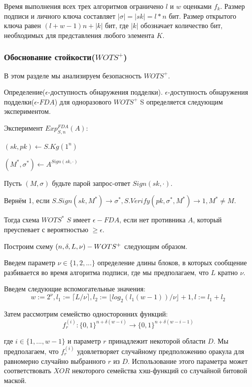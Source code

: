 \documentclass[a4paper, 14pt]{extarticle}
\begin{document}
Время выполнения всех трех алгоритмов ограничено $l$ и $w$ оценками $f_{k}$. Размер подписи и личного ключа составляет $|\sigma| = |sk| = l*n$ бит. Размер открытого ключа равен $(l + w - 1)n + |k|$ бит, где $|k|$ обозначает количество бит, необходимых для представления любого элемента $K$.
\subsubsection{Обоснование стойкости($WOTS^{+}$)}
В этом разделе мы анализируем безопасность $WOTS^{+}$.

Определение($\epsilon$-доступность обнаружения подделки). $\epsilon$-доступность обнаружения подделки($\epsilon$-$FDA$) для одноразового $WOTS^{+}$ S определяется следующим экспериментом.

Эксперимент $Exp^{F D A}_{S,n}(A)$:

\hspace{10mm} $(sk, pk) \leftarrow S.Kg(1^n)$

\hspace{10mm} $(M^{*}, \sigma^{*}) \leftarrow A^{Sign(sk,\cdot)}$

Пусть $(M, \sigma)$ будьте парой запрос-ответ $Sign(sk,\cdot)$.

Вернём 1, если $S.Sign(sk, M^{*}) \rightarrow \sigma^{*}, S.Verify(pk, \sigma^{*}, M^{*}) \rightarrow 1, M^{*} \neq M$.

Тогда схема $WOTS^{*}$ $S$ имеет $\epsilon-FDA$, если нет противника $A$, который преуспевает с вероятностью $\geq \epsilon$.

Построим схему $(n, \delta, L, \nu)-W\-OTS^{+}$ следующим образом.

Введем параметр $\nu \in \{1, 2, ...\}$ определение длины блоков, в которых сообщение разбивается во время алгоритма подписи, где мы предполагаем, что $L$ кратно $\nu$. 

Введем следующие вспомогательные значения:
\[w := 2^{\nu}, l_{1} := \lceil L/\nu \rceil, l_{2} := \lfloor log_{2}(l_{1}(w - 1))/\nu \rfloor + 1, l := l_{1} + l_{2}\]

Затем рассмотрим семейство односторонних функций:
\[ f^{(i)}_{r} : \{0,1\}^{n+\delta(w - i)} \rightarrow \{0,1\}^{n+\delta(w - i - 1)} \]

где $i \in \{1, ..., w - 1\}$ и параметр $r$ принадлежит некоторой области $D$. Мы предполагаем, что $f^{(i)}_{r}$ удовлетворяет случайному предположению оракула для равномерно случайно выбранного $r$ из $D$. Использование этого параметра может соответствовать $XOR$ некоторого семейства хэш-функций со случайной битовой маской.
\end{document}
